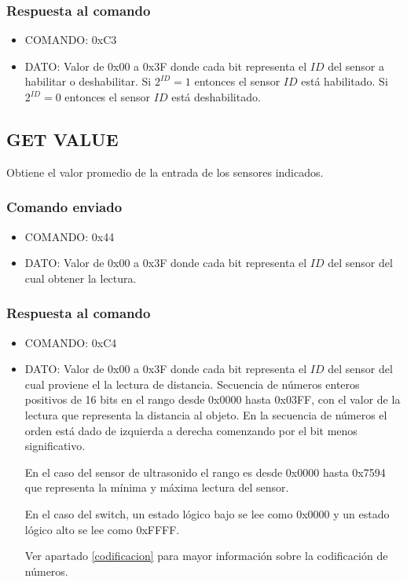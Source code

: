 \documentclass[a4paper,10pt]{article}
\begin{document}
\subsubsection*{Respuesta al comando}

\begin{itemize}
	\item{COMANDO:} 0xC3
	\item{DATO:} Valor de 0x00 a 0x3F donde cada bit representa el $ID$ del sensor a habilitar o deshabilitar.
	Si $2^{ID} = 1$ entonces el sensor $ID$ est\'a habilitado.
	Si $2^{ID} = 0$ entonces el sensor $ID$ est\'a deshabilitado.
\end{itemize}

\subsection{GET VALUE}
\label{get_value_ds}

Obtiene el valor promedio de la entrada de los sensores indicados.

\subsubsection*{Comando enviado}

\begin{itemize}
	\item{COMANDO:} 0x44
	\item{DATO:} Valor de 0x00 a 0x3F donde cada bit representa el $ID$ del sensor del cual obtener la lectura.
\end{itemize}

\subsubsection*{Respuesta al comando}

\begin{itemize}
	\item{COMANDO:} 0xC4
	\item{DATO:} Valor de 0x00 a 0x3F donde cada bit representa el $ID$ del sensor del cual proviene el la lectura de distancia.
	Secuencia de n\'umeros enteros positivos de 16 bits en el rango desde 0x0000 hasta 0x03FF, con el valor de la lectura que representa la distancia al objeto.
	En la secuencia de n\'umeros el orden est\'a dado de izquierda a derecha comenzando por el bit menos significativo.

	En el caso del sensor de ultrasonido el rango es desde 0x0000 hasta 0x7594 que representa la m\'inima y m\'axima lectura del sensor.

	En el caso del switch, un estado l\'ogico bajo se lee como 0x0000 y un estado l\'ogico alto se lee como 0xFFFF.

	Ver apartado \ref{codificacion} para mayor informaci\'on sobre la codificaci\'on de n\'umeros.
\end{itemize}
\end{document}
